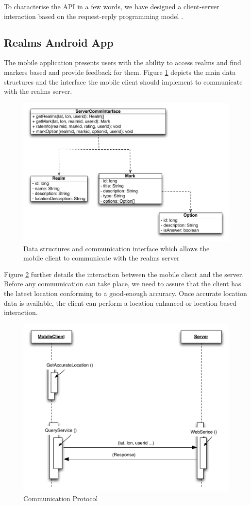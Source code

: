 \noindent To characterise the API in a few words, we have designed a client-server interaction based on the request-reply programming model \cite{Coulouris:2005}.

\subsection{Realms Android App} %
\label{sub:realms_android_app}
The mobile application presents users with the ability to access realms and find markers based and provide feedback for them. Figure \ref{fig.design.mobile_client} depicts the main data structures and the interface the mobile client should implement to communicate with the realms server.
\begin{figure}[H]
	\centering
	\includegraphics[width=1.0\linewidth]{fig/mobile_client}
	\caption{Data structures and communication interface which allows the mobile client to communicate with the realms server}
	\label{fig.design.mobile_client}
\end{figure}
\noindent Figure \ref{fig.design.comm_protocol} further details the interaction between the mobile client and the server. Before any communication can take place, we need to assure that the client has the latest location conforming to a good-enough accuracy. Once accurate location data is available, the client can perform a location-enhanced or location-based interaction.
\begin{figure}[H]
	\centering
	\includegraphics[width=1.0\linewidth]{fig/abstract_communication_protocol}
	\caption{Communication Protocol}
	\label{fig.design.comm_protocol}
\end{figure}
